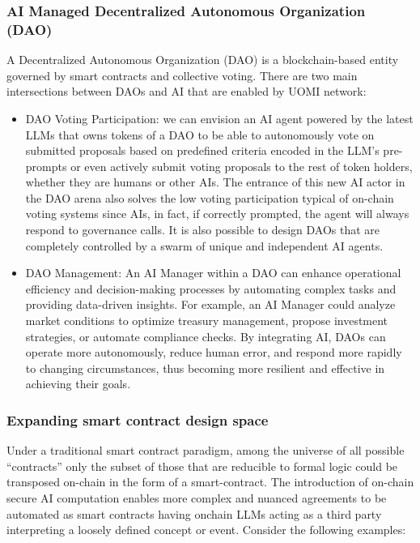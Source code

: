 \documentclass{article}
\begin{document}
\subsubsection{AI Managed Decentralized Autonomous Organization (DAO) }

A Decentralized Autonomous Organization (DAO) is a blockchain-based entity governed by smart contracts and collective voting. There are two main intersections between DAOs and AI that are enabled by UOMI network:

\begin{itemize}


\item DAO Voting Participation: we can envision an AI agent powered by the latest LLMs that owns tokens of a DAO to be able to autonomously vote on submitted proposals based on predefined criteria encoded in the LLM’s pre-prompts or even actively submit voting proposals to the rest of token holders, whether they are humans or other AIs. The entrance of this new AI actor in the DAO arena also solves the low voting participation typical of on-chain voting systems since AIs, in fact, if correctly prompted, the agent will always respond to governance calls. It is also possible to design DAOs that are completely controlled by a swarm of unique and independent AI agents. 


\item DAO Management: An AI Manager within a DAO can enhance operational efficiency and decision-making processes by automating complex tasks and providing data-driven insights. For example, an AI Manager could analyze market conditions to optimize treasury management, propose investment strategies, or automate compliance checks.  By integrating AI, DAOs can operate more autonomously, reduce human error, and respond more rapidly to changing circumstances, thus becoming more resilient and effective in achieving their goals.

\end{itemize}

\subsubsection{Expanding smart contract design space}

Under a traditional smart contract paradigm, among the universe of all possible “contracts” only the subset of those that are reducible to formal logic could be transposed on-chain in the form of a smart-contract. The introduction of on-chain secure AI computation enables more complex and nuanced agreements to be automated as smart contracts having onchain LLMs acting as a third party interpreting a loosely defined concept or event.
Consider the following examples:
\end{document}
